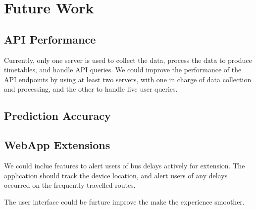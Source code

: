 \chapter{Future Work}

\section{API Performance}
\par Currently, only one server is used to collect the data, process the data to produce timetables, and handle API queries. We could improve the performance of the API endpoints by using at least two servers, with one in charge of data collection and processing, and the other to handle live user queries.


\section{Prediction Accuracy}


\section{WebApp Extensions}
\par We could inclue features to alert users of bus delays actively for extension. The application should track the device location, and alert users of any delays occurred on the frequently travelled routes.

\par The user interface could be furture improve the make the experience smoother.
